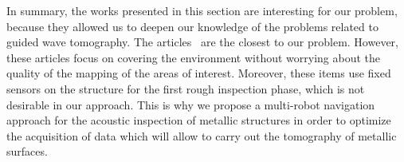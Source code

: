 In summary, the works presented in this section are interesting for our problem, because they allowed us to deepen our knowledge of the problems related to guided wave tomography.
The articles~\cite{7487624, 7139673} are the closest to our problem.
However, these articles focus on covering the environment without worrying about the quality of the mapping of the areas of interest.
Moreover, these items use fixed sensors on the structure for the first rough inspection phase, which is not desirable in our approach.
This is why we propose a multi-robot navigation approach for the acoustic inspection of metallic structures in order to optimize the acquisition of data which will allow to carry out the tomography of metallic surfaces.

